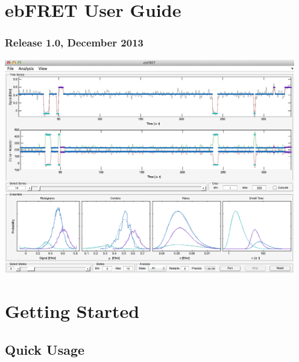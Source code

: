 \documentclass[12pt,article,oldfontcommands]{memoir}
\newcommand{\indt}{\qquad}
\begin{document}
\section*{ebFRET User Guide}
\subsubsection*{Release 1.0, December 2013}

\indt\includegraphics[width=5in]{images/ebfret_mainwindow}

\tableofcontents*



\section{Getting Started}
\label{Getting Started}

\subsection{Quick Usage}
\end{document}
